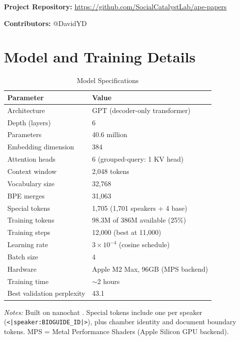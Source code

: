 \documentclass[12pt]{article}
\begin{document}
\noindent\textbf{Project Repository:} \url{https://github.com/SocialCatalystLab/ape-papers}

\noindent\textbf{Contributors:} @DavidYD

\label{apep_main_text_end}
\newpage


\newpage
\appendix

\section{Model and Training Details}
\label{app:training}

\begin{table}[H]
\centering
\caption{Model Specifications}
\label{tab:model}
\begin{threeparttable}
\begin{tabular}{ll}
\toprule
Parameter & Value \\
\midrule
Architecture & GPT (decoder-only transformer) \\
Depth (layers) & 6 \\
Parameters & 40.6 million \\
Embedding dimension & 384 \\
Attention heads & 6 (grouped-query: 1 KV head) \\
Context window & 2,048 tokens \\
Vocabulary size & 32,768 \\
\quad BPE merges & 31,063 \\
\quad Special tokens & 1,705 (1,701 speakers + 4 base) \\
\midrule
Training tokens & 98.3M of 386M available (25\%) \\
Training steps & 12,000 (best at 11,000) \\
Learning rate & $3 \times 10^{-4}$ (cosine schedule) \\
Batch size & 4 \\
Hardware & Apple M2 Max, 96GB (MPS backend) \\
Training time & $\sim$2 hours \\
Best validation perplexity & 43.1 \\
\bottomrule
\end{tabular}
\begin{tablenotes}[flushleft]
\small
\item \textit{Notes:} Built on nanochat \citep{karpathy2025}. Special tokens include one per speaker (\texttt{<|speaker:BIOGUIDE\_ID|>}), plus chamber identity and document boundary tokens. MPS = Metal Performance Shaders (Apple Silicon GPU backend).
\end{tablenotes}
\end{threeparttable}
\end{table}
\end{document}
